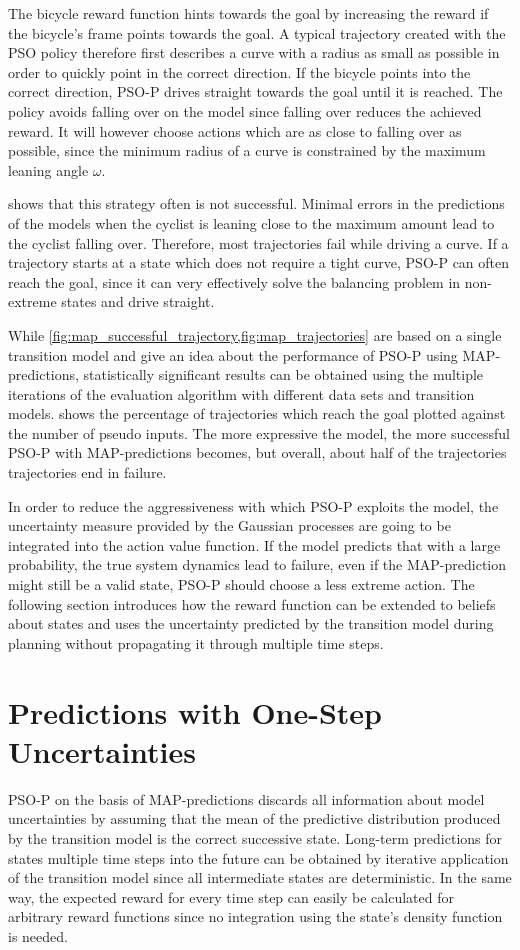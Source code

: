 The bicycle reward function hints towards the goal by increasing the reward if the bicycle's frame points towards the goal.
A typical trajectory created with the PSO policy therefore first describes a curve with a radius as small as possible in order to quickly point in the correct direction.
If the bicycle points into the correct direction, PSO-P drives straight towards the goal until it is reached.
The policy avoids falling over on the model since falling over reduces the achieved reward.
It will however choose actions which are as close to falling over as possible, since the minimum radius of a curve is constrained by the maximum leaning angle $\omega$.

 shows that this strategy often is not successful.
Minimal errors in the predictions of the models when the cyclist is leaning close to the maximum amount lead to the cyclist falling over.
Therefore, most trajectories fail while driving a curve.
If a trajectory starts at a state which does not require a tight curve, PSO-P can often reach the goal, since it can very effectively solve the balancing problem in non-extreme states and drive straight.

While \cref{fig:map_successful_trajectory,fig:map_trajectories} are based on a single transition model and give an idea about the performance of PSO-P using MAP-predictions, statistically significant results can be obtained using the multiple iterations of the evaluation algorithm with different data sets and transition models.
 shows the percentage of trajectories which reach the goal plotted against the number of pseudo inputs.
The more expressive the model, the more successful PSO-P with MAP-predictions becomes, but overall, about half of the trajectories trajectories end in failure.

In order to reduce the aggressiveness with which PSO-P exploits the model, the uncertainty measure provided by the Gaussian processes are going to be integrated into the action value function.
If the model predicts that with a large probability, the true system dynamics lead to failure, even if the MAP-prediction might still be a valid state, PSO-P should choose a less extreme action.
The following section introduces how the reward function can be extended to beliefs about states and uses the uncertainty predicted by the transition model during planning without propagating it through multiple time steps.

\section{Predictions with One-Step Uncertainties}
PSO-P on the basis of MAP-predictions discards all information about model uncertainties by assuming that the mean of the predictive distribution produced by the transition model is the correct successive state.
Long-term predictions for states multiple time steps into the future can be obtained by iterative application of the transition model since all intermediate states are deterministic.
In the same way, the expected reward for every time step can easily be calculated for arbitrary reward functions since no integration using the state's density function is needed.

